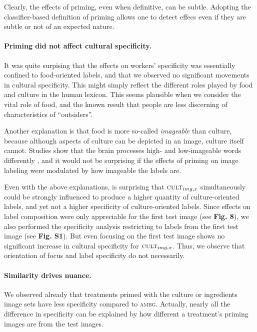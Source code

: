 \documentclass[a4paper]{report}
\begin{document}
Clearly, the effects of
priming, even when definitive, can be subtle. Adopting the classifier-based
definition of priming allows one to detect effecs even if they are subtle or
not of an expected nature.


\paragraph{Priming did not affect cultural specificity.}
It was quite surpising that the effects on workers' specificity was essentially
confined to food-oriented labels, and that we observed no significant movements
in cultural specificity.   This might simply reflect the different roles
played by food and culture in the human lexicon.  This seems plausible when we 
consider the vital role of food, and the known result that people are less
discerning of characteristics of ``outsiders''.

Another explanation is that food is more so-called \textit{imageable} than 
culture, because although aspects of culture can be depicted in an image,
culture itself cannot.  Studies show that the brain processes high- and 
low-imageable words differently \cite{Swaab200299}, and it would not be 
surprising if the effects of priming on image labeling were modulated by how 
imageable the labels are.

Even with the above explanations, is surprising that 
$\textsc{cult}_{img,x}$ simultaneously could be strongly influenced to 
produce a higher quantity of culture-oriented labels, and yet not a higher
specificity of culture-oriented labels.  Since effects on 
label composition were only appreciable for the first test image 
(see \textbf{Fig. 8}), we also
performed the specificity analysis restricting to labels from the first
test image (see \textbf{Fig. S1}).  But even focusing on the first test image
shows no significant increase in cultural specificity for 
$\textsc{cult}_{img,x}$.  Thus, we observe that orientation of focus and 
label specificity do not necessarily.


\paragraph{Similarity drives nuance.}
We observed already that treatments primed with the 
culture or ingredients image sets have less specificity compared to 
\textsc{ambg}.  Actually, nearly all the difference in specificity
can be explained by how different a treatment's priming images are from the 
test images.  
\end{document}
